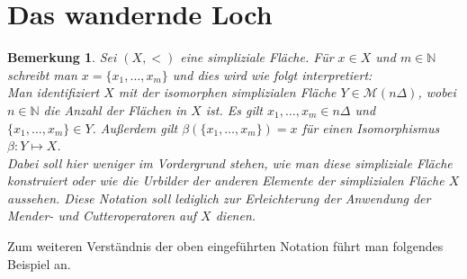 \documentclass[12pt,titlepage,twoside,cleardoublepage]{article}
\theoremstyle{nummermitklammern}
\newtheorem{bemerkung}[temp]{Bemerkung}
\newtheorem{bemerkung}[zahl]{Bemerkung}
\numberwithin{equation}{section}
\begin{document}
\section{Das wandernde Loch}\label{kwh}
\begin{bemerkung}\label{ident}
Sei $(X,<)$ eine simpliziale Fläche.
Für $x\in X$ und $m \in \mathbb{N}$ schreibt man $x=\{x_1,\ldots,x_m\}$ und dies wird wie folgt interpretiert:\\ Man identifiziert $X$ mit der isomorphen simplizialen Fläche $Y \in \mathcal{M}(n \Delta)$, wobei $n\in \mathbb{N}$ die Anzahl der Flächen in $X$ ist. Es gilt $x_1,\ldots,x_m \in n\Delta$ und $\{x_1,\ldots,x_m\}\in Y$. Außerdem gilt $\beta(\{x_1,\ldots,x_m\})=x$ für einen  Isomorphismus $\beta: Y \mapsto X$. \\
Dabei soll hier weniger im Vordergrund stehen, wie man diese simpliziale Fläche konstruiert oder wie die Urbilder der anderen Elemente der simplizialen Fläche $X$ aussehen. Diese Notation soll lediglich zur Erleichterung der Anwendung der Mender- und Cutteroperatoren auf $X$ dienen. 
\end{bemerkung}
Zum weiteren Verständnis der oben eingeführten Notation führt man folgendes Beispiel an.
\end{document}
